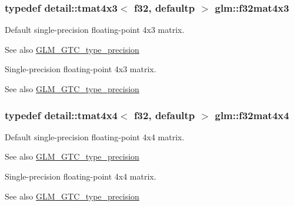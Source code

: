 \subsubsection[{\texorpdfstring{f32mat4x3}{f32mat4x3}}]{\setlength{\rightskip}{0pt plus 5cm}typedef detail\+::tmat4x3$<$ f32, defaultp $>$ {\bf glm\+::f32mat4x3}}\hypertarget{group__gtc__type__precision_ga5102ae88531e072efe57e75354e10347}{}\label{group__gtc__type__precision_ga5102ae88531e072efe57e75354e10347}
Default single-\/precision floating-\/point 4x3 matrix. \begin{DoxySeeAlso}{See also}
\hyperlink{group__gtc__type__precision}{G\+L\+M\+\_\+\+G\+T\+C\+\_\+type\+\_\+precision}
\end{DoxySeeAlso}
Single-\/precision floating-\/point 4x3 matrix. \begin{DoxySeeAlso}{See also}
\hyperlink{group__gtc__type__precision}{G\+L\+M\+\_\+\+G\+T\+C\+\_\+type\+\_\+precision} 
\end{DoxySeeAlso}
\subsubsection[{\texorpdfstring{f32mat4x4}{f32mat4x4}}]{\setlength{\rightskip}{0pt plus 5cm}typedef detail\+::tmat4x4$<$ f32, defaultp $>$ {\bf glm\+::f32mat4x4}}\hypertarget{group__gtc__type__precision_ga939fc7fbeb62575aca543d3a0342d807}{}\label{group__gtc__type__precision_ga939fc7fbeb62575aca543d3a0342d807}
Default single-\/precision floating-\/point 4x4 matrix. \begin{DoxySeeAlso}{See also}
\hyperlink{group__gtc__type__precision}{G\+L\+M\+\_\+\+G\+T\+C\+\_\+type\+\_\+precision}
\end{DoxySeeAlso}
Single-\/precision floating-\/point 4x4 matrix. \begin{DoxySeeAlso}{See also}
\hyperlink{group__gtc__type__precision}{G\+L\+M\+\_\+\+G\+T\+C\+\_\+type\+\_\+precision} 
\end{DoxySeeAlso}
